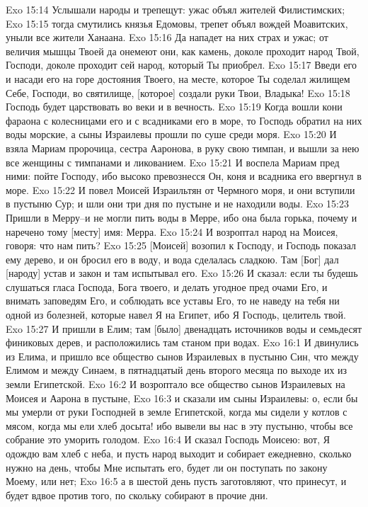 Exo 15:14  Услышали народы и трепещут: ужас объял жителей Филистимских;
Exo 15:15  тогда смутились князья Едомовы, трепет объял вождей Моавитских, уныли все жители Ханаана.
Exo 15:16  Да нападет на них страх и ужас; от величия мышцы Твоей да онемеют они, как камень, доколе проходит народ Твой, Господи, доколе проходит сей народ, который Ты приобрел.
Exo 15:17  Введи его и насади его на горе достояния Твоего, на месте, которое Ты соделал жилищем Себе, Господи, во святилище, [которое] создали руки Твои, Владыка!
Exo 15:18  Господь будет царствовать во веки и в вечность.
Exo 15:19  Когда вошли кони фараона с колесницами его и с всадниками его в море, то Господь обратил на них воды морские, а сыны Израилевы прошли по суше среди моря.
Exo 15:20  И взяла Мариам пророчица, сестра Ааронова, в руку свою тимпан, и вышли за нею все женщины с тимпанами и ликованием.
Exo 15:21  И воспела Мариам пред ними: пойте Господу, ибо высоко превознесся Он, коня и всадника его ввергнул в море.
Exo 15:22  И повел Моисей Израильтян от Чермного моря, и они вступили в пустыню Сур; и шли они три дня по пустыне и не находили воды.
Exo 15:23  Пришли в Мерру--и не могли пить воды в Мерре, ибо она была горька, почему и наречено тому [месту] имя: Мерра.
Exo 15:24  И возроптал народ на Моисея, говоря: что нам пить?
Exo 15:25  [Моисей] возопил к Господу, и Господь показал ему дерево, и он бросил его в воду, и вода сделалась сладкою. Там [Бог] дал [народу] устав и закон и там испытывал его.
Exo 15:26  И сказал: если ты будешь слушаться гласа Господа, Бога твоего, и делать угодное пред очами Его, и внимать заповедям Его, и соблюдать все уставы Его, то не наведу на тебя ни одной из болезней, которые навел Я на Египет, ибо Я Господь, целитель твой.
Exo 15:27  И пришли в Елим; там [было] двенадцать источников воды и семьдесят финиковых дерев, и расположились там станом при водах.
Exo 16:1  И двинулись из Елима, и пришло все общество сынов Израилевых в пустыню Син, что между Елимом и между Синаем, в пятнадцатый день второго месяца по выходе их из земли Египетской.
Exo 16:2  И возроптало все общество сынов Израилевых на Моисея и Аарона в пустыне,
Exo 16:3  и сказали им сыны Израилевы: о, если бы мы умерли от руки Господней в земле Египетской, когда мы сидели у котлов с мясом, когда мы ели хлеб досыта! ибо вывели вы нас в эту пустыню, чтобы все собрание это уморить голодом.
Exo 16:4  И сказал Господь Моисею: вот, Я одождю вам хлеб с неба, и пусть народ выходит и собирает ежедневно, сколько нужно на день, чтобы Мне испытать его, будет ли он поступать по закону Моему, или нет;
Exo 16:5  а в шестой день пусть заготовляют, что принесут, и будет вдвое против того, по скольку собирают в прочие дни.

